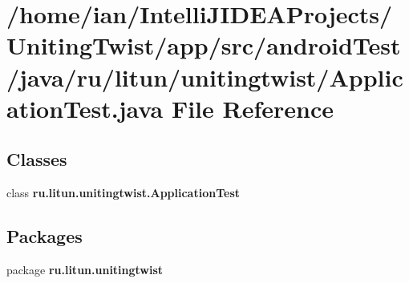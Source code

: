\section{/home/ian/\+Intelli\+J\+I\+D\+E\+A\+Projects/\+Uniting\+Twist/app/src/android\+Test/java/ru/litun/unitingtwist/\+Application\+Test.java File Reference}
\label{_application_test_8java}
\subsection*{Classes}
\begin{DoxyCompactItemize}
\item 
class \textbf{ ru.\+litun.\+unitingtwist.\+Application\+Test}
\end{DoxyCompactItemize}
\subsection*{Packages}
\begin{DoxyCompactItemize}
\item 
package \textbf{ ru.\+litun.\+unitingtwist}
\end{DoxyCompactItemize}
